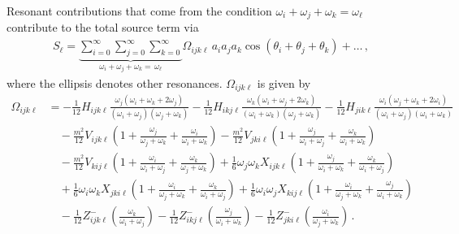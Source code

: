 \documentclass[letterpaper,11pt]{article}
\newcommand{\oi}{\omega_i}
\newcommand{\oj}{\omega_j}
\newcommand{\ok}{\omega_k}
\newcommand{\ol}{\omega_\ell}
\newcommand{\thi}{\theta_i}
\newcommand{\thj}{\theta_j}
\newcommand{\thk}{\theta_k}
\begin{document}
Resonant contributions that come from the condition $\oi + \oj + \ok = \ol$ contribute to the total source term via
\begin{align}
S_\ell = \underbrace{\sum_{i=0}^\infty \sum_{j=0}^\infty \sum_{k=0}^\infty}_{\oi + \oj + \ok = \, \ol} \Omega_{ijk\ell} \, a_i a_j a_k \cos \left( \thi + \thj + \thk \right) + \ldots \, ,
\end{align}
where the ellipsis denotes other resonances. $\Omega_{ijk\ell}$ is given by
\begin{align}
\label{omega}
\Omega_{ijk\ell} &= -\frac{1}{12}H_{ijk\ell} \frac{\oj (\oi + \ok +2\oj)}{(\oi + \oj)(\oj + \ok)} - \frac{1}{12} H_{ikj\ell} \frac{\ok (\oi + \oj + 2\ok)}{(\oi + \ok)(\oj + \ok)}- \frac{1}{12} H_{jik\ell} \frac{\oi (\oj + \ok +2\oi)}{(\oi + \oj)(\oi + \ok)} \nonumber \\
%
& \quad - \frac{m^2}{12} V_{ijk\ell} \left( 1 + \frac{\oj}{\oj + \ok} + \frac{\oi}{\oi + \ok} \right) - \frac{m^2}{12} V_{jki\ell} \left( 1 + \frac{\oj}{\oi + \oj} + \frac{\ok}{\oi + \ok} \right) \nonumber \\
%
& \quad - \frac{m^2}{12} V_{kij\ell} \left( 1 + \frac{\oi}{\oi + \oj} + \frac{\ok}{\oj + \ok} \right)  + \frac{1}{6} \oj \ok X_{ijk\ell} \left( 1 + \frac{\oj}{\oi + \ok} + \frac{\ok}{\oi + \oj} \right) \nonumber \\
%
& \quad + \frac{1}{6} \oi \ok X_{jki\ell} \left( 1 + \frac{\oi}{\oj + \ok} + \frac{\ok}{\oi + \oj} \right) + \frac{1}{6} \oi \oj X_{kij\ell} \left( 1 + \frac{\oi}{\oj + \ok} + \frac{\oj}{\oi + \ok} \right) \nonumber \\
%
& \quad - \frac{1}{12} Z^-_{ijk\ell} \left( \frac{\ok}{\oi + \oj} \right) - \frac{1}{12} Z^-_{ikj\ell} \left( \frac{\oj}{\oi + \ok} \right) - \frac{1}{12} Z^-_{jki\ell}  \left( \frac{\oi}{\oj + \ok} \right) \, .
\end{align}
\end{document}
